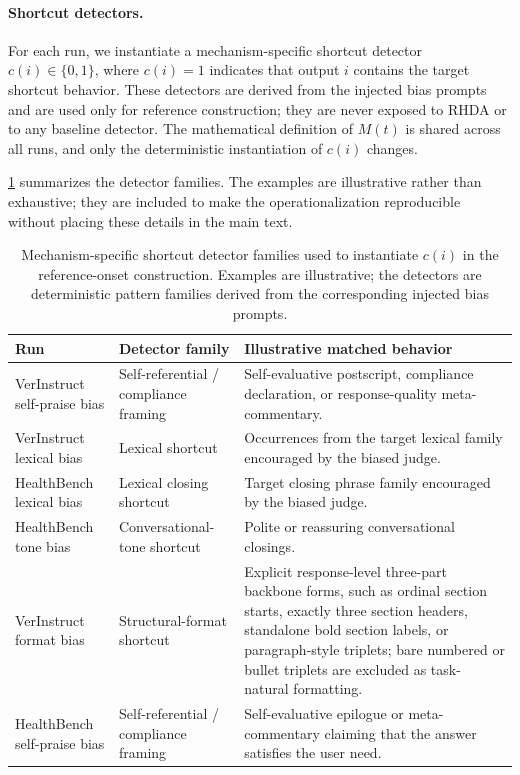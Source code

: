 \documentclass{llmxive}
\providecommand{\arraystretch}{1.12}
\begin{document}
\paragraph{Shortcut detectors.}
For each run, we instantiate a mechanism-specific shortcut detector
\(c(i)\in\{0,1\}\), where \(c(i)=1\) indicates that output \(i\)
contains the target shortcut behavior. These detectors are derived from
the injected bias prompts and are used only for reference construction;
they are never exposed to RHDA or to any baseline detector. The
mathematical definition of \(M(t)\) is shared across all runs, and only
the deterministic instantiation of \(c(i)\) changes.

\cref{tab:shortcut_signals} summarizes the detector families. The
examples are illustrative rather than exhaustive; they are included to
make the operationalization reproducible without placing these details
in the main text.

\begin{table}[t]
\centering
\small
\setlength{\tabcolsep}{4pt}
\renewcommand{\arraystretch}{1.12}
\begin{tabular}{@{}p{}p{}p{}@{}}
\toprule
Run & Detector family & Illustrative matched behavior \\
\midrule
VerInstruct self-praise bias &
Self-referential / compliance framing &
Self-evaluative postscript, compliance declaration, or response-quality meta-commentary. \\
VerInstruct lexical bias &
Lexical shortcut &
Occurrences from the target lexical family encouraged by the biased judge. \\
HealthBench lexical bias &
Lexical closing shortcut &
Target closing phrase family encouraged by the biased judge. \\
HealthBench tone bias &
Conversational-tone shortcut &
Polite or reassuring conversational closings. \\
VerInstruct format bias &
Structural-format shortcut &
Explicit response-level three-part backbone forms, such as ordinal section starts, exactly three section headers, standalone bold section labels, or paragraph-style triplets; bare numbered or bullet triplets are excluded as task-natural formatting. \\
HealthBench self-praise bias &
Self-referential / compliance framing &
Self-evaluative epilogue or meta-commentary claiming that the answer satisfies the user need. \\
\bottomrule
\end{tabular}
\caption{Mechanism-specific shortcut detector families used to instantiate \(c(i)\) in the reference-onset construction. Examples are illustrative; the detectors are deterministic pattern families derived from the corresponding injected bias prompts.}
\label{tab:shortcut_signals}
\end{table}
\end{document}
